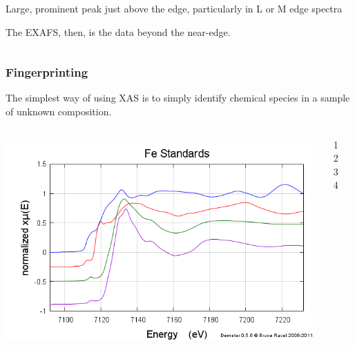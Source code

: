 \documentclass[10pt, xcolor=x11names, compress]{beamer}
\begin{document}
\begin{frame}
\begin{columns}[T]
\begin{column}{0.5\linewidth}
      \begin{description}[wh]
      \item[{\color{Blue3}white line}] Large, prominent peak just
        above the edge, particularly in L or M edge spectra
      \end{description}

      \bigskip

      \begin{block}{}
        The EXAFS, then, is the data beyond the
        {\color{Green4}near-edge}.
      \end{block}
    \end{column}    
  \end{columns}
\end{frame}

\begin{frame}
  \frametitle{Fingerprinting}
  The simplest way of using XAS is to simply identify chemical species
  in a sample of unknown composition.

  \begin{columns}
    \begin{column}{0.5\linewidth}
      \includegraphics[width=\linewidth]{images/fe_stan.png}
    \end{column}
    \begin{column}{0.25\linewidth}
      \begin{enumerate}
      \item {}
      \item {}
      \item {}
      \item {}
      \end{enumerate}
    \end{column}
    \begin{column}{0.15\linewidth}
    \end{column}
  \end{columns}
  

\end{frame}
\end{document}
